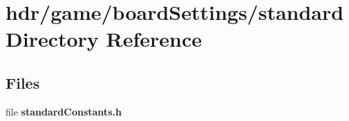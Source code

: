 \section{hdr/game/board\-Settings/standard Directory Reference}
\label{dir_760deb6d066789da90e20d9b6f10eabd}
\subsection*{Files}
\begin{DoxyCompactItemize}
\item 
file {\bfseries standard\-Constants.\-h}
\end{DoxyCompactItemize}
